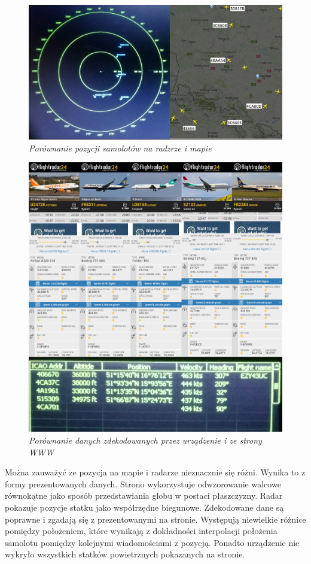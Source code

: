 \documentclass[eng,printmode]{mgr}
\begin{document}
\begin{figure}[!h]
    \centering
    \includegraphics[width=\textwidth]{images/radarTest2.png}
    \caption{\textit{Porównanie pozycji samolotów na radzrze i mapie}}
\end{figure}
\newpage
\begin{figure}[!h]
    \centering
    \includegraphics[width=\textwidth]{images/dataTest.png}
    \caption{\textit{Porównanie danych zdekodowanych przez urządzenie i ze strony WWW}}
\end{figure}

Można zauważyć ze pozycja na mapie i radarze nieznacznie się różni. Wynika to z formy prezentowanych danych. Strono wykorzystuje odwzorowanie walcowe równokątne jako sposób przedstawiania globu w postaci płaszczyzny. Radar pokazuje pozycje statku jako współrzędne biegunowe. Zdekodowane dane są poprawne i zgadają się z prezentowanymi na stronie. Występują niewielkie różnice pomiędzy położeniem, które wynikają z dokładności interpolacji położenia samolotu pomiędzy kolejnymi wiadomościami z pozycją. Ponadto urządzenie nie wykryło wszystkich statków powietrznych pokazanych na stronie.
\\
\end{document}
